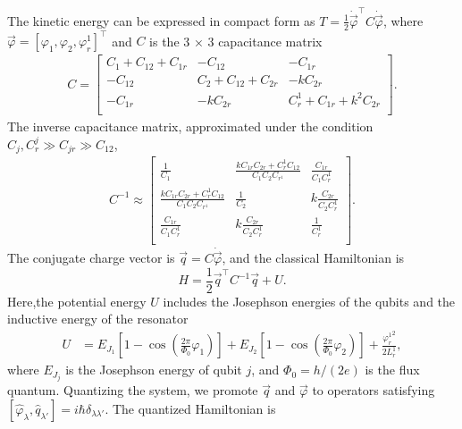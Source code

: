 \documentclass[reprint,superscriptaddress,preprintnumbers,longbibliography,
amsmath,amssymb,aps,floatfix,pra,twocolumn, tightenlines %
]{revtex4-2}
\begin{document}
The kinetic energy can be expressed in compact form as \( T = \frac{1}{2} \dot{\vec{\varphi}}^\top C \dot{\vec{\varphi}} \), where \( \vec{\varphi} = [\varphi_1, \varphi_2, \varphi_r^1]^\top \) and \( C \) is the 3 × 3 capacitance matrix
\begin{equation}
\begin{aligned}
C=\begin{bmatrix}
C_1+C_{12}+C_{1r} &  -C_{12} & -C_{1r} \\
-C_{12} &  C_2+C_{12}+C_{2r} & -k C_{2r} \\
-C_{1r} &  -k C_{2r} & C_r^1+C_{1r}+k^2 C_{2r} \\
\end{bmatrix}.
\end{aligned}
\end{equation}
The inverse capacitance matrix, approximated under the condition \( C_j, C_r^j \gg C_{jr} \gg C_{12} \), 
\begin{equation}
\begin{aligned}
C^{-1} \approx \begin{bmatrix}
\frac{1}{C_1} &  \frac{ k C_{1r} C_{2r}  + C_r^1 C_{12}}{C_{1} C_{2} C_{r^1}} & \frac{C_{1r}}{C_1 C_r^1}\\
\frac{k C_{1r} C_{2r}  + C_r^1  C_{12}}{C_{1} C_{2} C_{r^1}}  & \frac{1}{C_2} & k \frac{C_{2r}}{C_2 C_r^1}\\
\frac{C_{1r}}{C_1 C_r^1} & k \frac{C_{2r}}{C_2 C_r^1} & \frac{1}{C_r^1} \\
\end{bmatrix}.
\end{aligned}
\end{equation}
The conjugate charge vector is \( \vec{q} = C \dot{\vec{\varphi}} \), and the classical Hamiltonian is
\begin{equation}
H = \frac{1}{2} \vec{q}^\top C^{-1} \vec{q} + U. 
\end{equation}
Here,the potential energy $U$ includes the Josephson energies of the qubits and the inductive energy of the resonator
 \begin{equation}
    \begin{aligned}
        U &= E_{J_1}\left[1-\cos\left(\frac{2\pi}{\Phi_0}\varphi_1\right)\right]+E_{J_2}\left[1-\cos\left(\frac{2\pi}{\Phi_0}\varphi_2\right)\right]+\frac{{\varphi_r^1}^2}{2L_r^1},
    \end{aligned}
\end{equation}
where \( E_{J_j} \) is the Josephson energy of qubit \( j \), and \( \Phi_0 = h / (2e) \) is the flux quantum. Quantizing the system, we promote \( \vec{q} \) and \( \vec{\varphi} \) to operators satisfying \( [\hat{\varphi}_\lambda, \hat{q}_{\lambda'}] = i \hbar \delta_{\lambda \lambda'} \). The quantized Hamiltonian is
\end{document}
